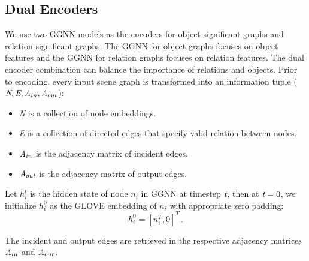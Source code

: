 \documentclass[letterpaper]{article} %
\begin{document}
\subsection{Dual Encoders}
We use two GGNN models as the encoders for object significant graphs and relation significant graphs. 
The GGNN for object graphs focuses on object features and the GGNN for relation graphs focuses on relation features. 
The dual encoder combination can balance the importance of relations and objects.
Prior to encoding, every input scene graph is transformed into an information tuple ($\emph{N}, \emph{E}, \emph{A}_{in}, \emph{A}_{out}$):\vspace{-0.02in}
\begin{itemize}
\setlength{\itemsep}{5pt}
\setlength{\parsep}{5pt}
\setlength{\parskip}{5pt}
    \item \emph{N} is a collection of node embeddings.\vspace{-0.06in}
    \item \emph{E} is a collection of directed edges that specify valid relation between nodes.\vspace{-0.06in}
    \item $\emph{A}_{in}$ is the adjacency matrix of incident edges.\vspace{-0.06in}
    \item $\emph{A}_{out}$ is the adjacency matrix of output edges.\vspace{-0.06in}
\end{itemize}

Let $h_i^t$ is the hidden state of node $n_i$ in GGNN at timestep $\emph{t}$, then at $\emph{t}=0$, we initialize $h_i^0$ as the GLOVE embedding of $n_i$ with appropriate zero padding:
\begin{equation}
    h_i^0 = [n_i^T, 0]^T  \, .
\end{equation}

The incident and output edges are retrieved in the respective adjacency matrices $\emph{A}_{in}$ and $\emph{A}_{out}$. 
\end{document}
